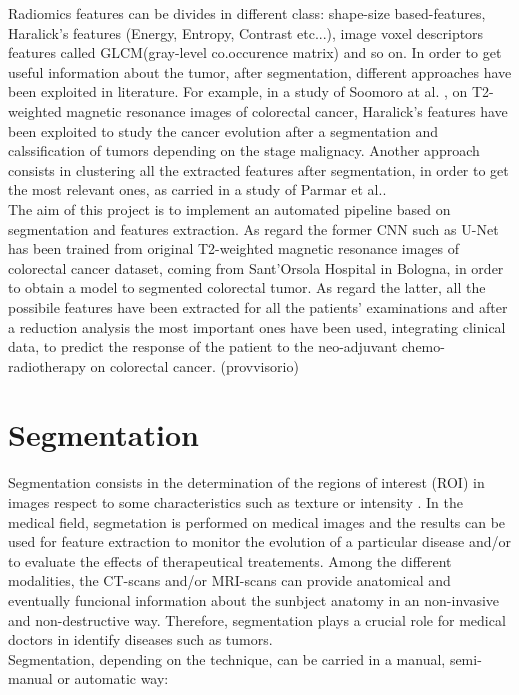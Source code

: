 \documentclass[12pt,a4paper]{report}
\begin{document}
Radiomics features can be divides in different class: shape-size based-features, Haralick's features (Energy, Entropy, Contrast etc...), image voxel descriptors features called GLCM(gray-level co.occurence matrix) and so on. In order to get useful information about the tumor, after segmentation, different approaches have been exploited in literature. For example, in a study of Soomoro at al. \cite{Haraliks}, on T2-weighted magnetic resonance images of colorectal cancer, Haralick's features have been exploited to study the cancer evolution after a segmentation and calssification of tumors depending on the stage malignacy. Another approach consists in clustering all the extracted features after segmentation, in order to get the most relevant ones, as carried in a study of Parmar et al.\cite{featurescluster}.\\
The aim of this project is to implement an automated pipeline based on segmentation and features extraction. As regard the former CNN such as U-Net has been trained from original T2-weighted magnetic resonance images of colorectal cancer dataset, coming from Sant'Orsola Hospital in Bologna, in order to obtain a model to segmented colorectal tumor. As regard the latter, all the possibile features have been extracted for all the patients' examinations and after a reduction analysis the most important ones have been used, integrating clinical data, to predict the response of the patient to the neo-adjuvant chemo-radiotherapy on colorectal cancer. (provvisorio)


\chapter{Segmentation}

Segmentation consists in the determination of the regions of interest (ROI) in images respect to some characteristics such as texture or intensity \cite{Biondi,segmentationreview}. In the medical field, segmetation is performed on medical images and the results can be used for feature extraction to monitor the evolution of a particular disease and/or to evaluate the effects of therapeutical treatements\cite{tesicoppola, Biondi, jovana}. Among the different modalities, the CT-scans and/or MRI-scans can provide anatomical and eventually funcional information about the sunbject anatomy in an non-invasive and non-destructive way. Therefore, segmentation plays a crucial role for medical doctors in identify diseases such as tumors.\\
Segmentation, depending on the technique, can be carried in a manual, semi-manual or automatic way:
\end{document}
